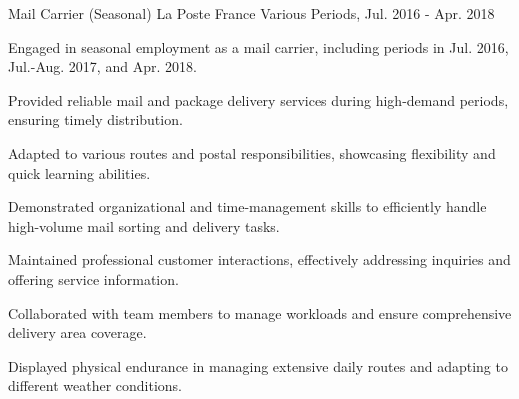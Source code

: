 

\begin{cventries}

\cventry
    {Mail Carrier (Seasonal)} %
    {La Poste} %
    {France} %
    {Various Periods, Jul. 2016 - Apr. 2018} %
    {
      \begin{cvitems} %
        \item {Engaged in seasonal employment as a mail carrier, including periods in Jul. 2016, Jul.-Aug. 2017, and Apr. 2018.}
        \item {Provided reliable mail and package delivery services during high-demand periods, ensuring timely distribution.}
        \item {Adapted to various routes and postal responsibilities, showcasing flexibility and quick learning abilities.}
        \item {Demonstrated organizational and time-management skills to efficiently handle high-volume mail sorting and delivery tasks.}
        \item {Maintained professional customer interactions, effectively addressing inquiries and offering service information.}
        \item {Collaborated with team members to manage workloads and ensure comprehensive delivery area coverage.}
        \item {Displayed physical endurance in managing extensive daily routes and adapting to different weather conditions.}
      \end{cvitems}
    }


\end{cventries}
